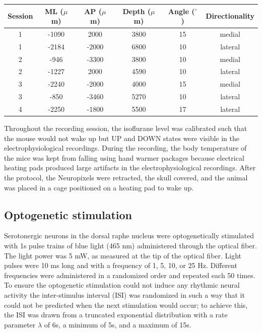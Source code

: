 \documentclass[11pt,a4paper,onecolumn]{article}
\begin{document}
\begin{table}[h]
\centering
\begin{tabular}{cccccc}
\toprule
\textbf{Session} & \textbf{ML ($\mu$m)} & \textbf{AP ($\mu$m)} & \textbf{Depth ($\mu$m)} & \textbf{Angle ($^\circ$)} & \textbf{Directionality} \\ \midrule
1 & -1090 & 2000 & 3800 & 15 & medial \\
1 & -2184 & -2000 & 6800 & 10 & lateral \\
2 & -946 & -3300 & 3800 & 10 & medial \\
2 & -1227 & 2000 & 4590 & 10 & lateral \\
3 & -2240 & -2000 & 4000 & 15 & medial \\
3 & -850 & -3460 & 5270 & 10 & lateral \\
4 & -2250 & -1800 & 5500 & 17 & lateral \\ \bottomrule
\end{tabular}
\end{table} 

\noindent
Throughout the recording session, the isoflurane level was calibrated such that the mouse would not wake up but UP and DOWN states were visible in the electrophysiological recordings. During the recording, the body temperature of the mice was kept from falling using hand warmer packages because electrical heating pads produced large artifacts in the electrophysiological recordings. After the protocol, the Neuropixels were retracted, the skull covered, and the animal was placed in a cage positioned on a heating pad to wake up.

\subsection*{Optogenetic stimulation}
Serotonergic neurons in the dorsal raphe nucleus were optogenetically stimulated with 1s pulse trains of blue light (465 nm) administered through the optical fiber. The light power was 5 mW, as measured at the tip of the optical fiber. Light pulses were 10 ms long and with a frequency of 1, 5, 10, or 25 Hz. Different frequencies were administered in a randomized order and repeated each 50 times. To ensure the optogenetic stimulation could not induce any rhythmic neural activity the inter-stimulus interval (ISI) was randomized in such a way that it could not be predicted when the next stimulation would occur; to achieve this, the ISI was drawn from a truncated exponential distribution with a rate parameter $\lambda$ of 6s, a minimum of 5s, and a maximum of 15s. 
\end{document}
